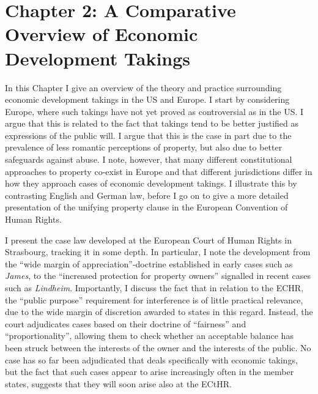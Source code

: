 \documentclass[12pt,a4paper]{article} %
\begin{document}
\section*{Chapter 2: A Comparative Overview of Economic Development Takings}

In this Chapter I give an overview of the theory and practice surrounding economic development takings in the US and Europe. I start by considering Europe, where such takings have not yet proved as controversial as in the US. I argue that this is related to the fact that takings tend to be better justified as expressions of the public will. I argue that this is the case in part due to the prevalence of less romantic perceptions of property, but also due to better safeguards against abuse. I note, however, that many different constitutional approaches to property co-exist in Europe and that different jurisdictions differ in how they approach cases of economic development takings. I illustrate this by contrasting English and German law, before I go on to give a more detailed presentation of the unifying property clause in the European Convention of Human Rights. 

I present the case law developed at the European Court of Human Rights in Strasbourg, tracking it in some depth. In particular, I note the development from the ``wide margin of appreciation''-doctrine established in early cases such as {\it James}, to the ``increased protection for property owners'' signalled in recent cases such as {\it Lindheim}. Importantly, I discuss the fact that in relation to the ECHR, the ``public purpose'' requirement for interference is of little practical relevance, due to the wide margin of discretion awarded to states in this regard. Instead, the court adjudicates cases based on their doctrine of ``fairness'' and ``proportionality'', allowing them to check whether an acceptable balance has been struck between the interests of the owner and the interests of the public. No case has so far been adjudicated that deals specifically with economic takings, but the fact that such cases appear to arise increasingly often in the member states, suggests that they will soon arise also at the ECtHR. 
\end{document}
